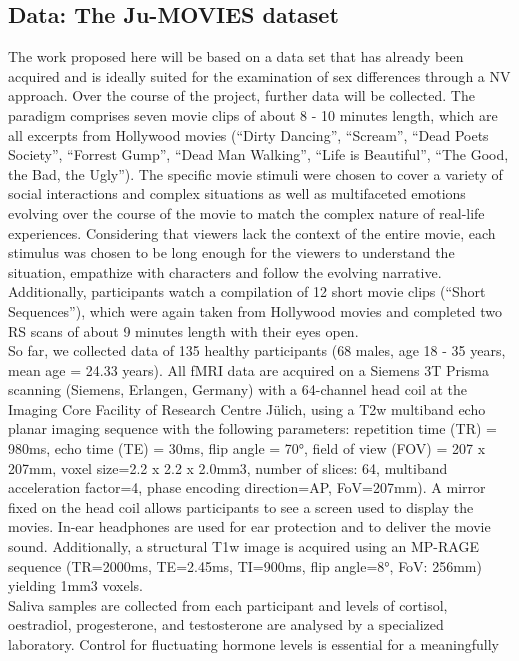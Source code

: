 \documentclass[11pt,a4paper]{article}
\begin{document}
\subsection*{Data: The Ju-MOVIES dataset}
The work proposed here will be based on a data set that has already been acquired and is ideally suited for 
the examination of sex differences through a NV approach. Over the course of the project, further data will be collected.
The paradigm comprises seven movie clips of about 8 - 10 minutes length, which are all excerpts from Hollywood movies 
(“Dirty Dancing”, “Scream”, “Dead Poets Society”, “Forrest Gump”, “Dead Man Walking”, “Life is Beautiful”, 
“The Good, the Bad, the Ugly”). The specific movie stimuli were chosen to cover a variety of social interactions 
and complex situations as well as multifaceted emotions evolving over the course of the movie to match 
the complex nature of real-life experiences. Considering that viewers lack the context of the entire movie, 
each stimulus was chosen to be long enough for the viewers to understand the situation, empathize with characters and 
follow the evolving narrative. Additionally, participants watch a compilation of 12 short movie clips (“Short Sequences”),
which were again taken from Hollywood movies and completed two RS scans of about 9 minutes length with their eyes open. \\
So far, we collected data of 135 healthy participants (68 males, age 18 - 35 years, mean age = 24.33 years). 
All fMRI data are acquired on a Siemens 3T Prisma scanning (Siemens, Erlangen, Germany) with a 64-channel head coil 
at the Imaging Core Facility of Research Centre Jülich, using a T2w multiband echo planar imaging sequence with the 
following parameters: repetition time (TR) = 980ms, echo time (TE) = 30ms, flip angle = 70°, field of view 
(FOV) = 207 x 207mm, voxel size=2.2 x 2.2 x 2.0mm3, number of slices: 64, multiband acceleration factor=4, 
phase encoding direction=AP,  FoV=207mm). A mirror fixed on the head coil allows participants to see a screen used 
to display the movies. In-ear headphones are used for ear protection and to deliver the movie sound. 
Additionally, a structural T1w image is acquired using an MP-RAGE sequence (TR=2000ms, TE=2.45ms, TI=900ms, 
flip angle=8°, FoV: 256mm) yielding 1mm3 voxels.\\
Saliva samples are collected from each participant and levels of cortisol, oestradiol, progesterone, and testosterone 
are analysed by a specialized laboratory. Control for fluctuating hormone levels is essential for a meaningfully 
\end{document}

